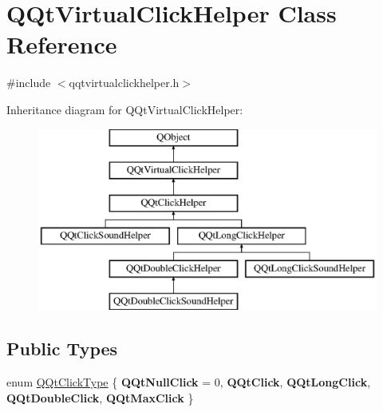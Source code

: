 \hypertarget{class_q_qt_virtual_click_helper}{}\section{Q\+Qt\+Virtual\+Click\+Helper Class Reference}
\label{class_q_qt_virtual_click_helper}


{\ttfamily \#include $<$qqtvirtualclickhelper.\+h$>$}

Inheritance diagram for Q\+Qt\+Virtual\+Click\+Helper\+:\begin{figure}[H]
\begin{center}
\leavevmode
\includegraphics[height=6.000000cm]{class_q_qt_virtual_click_helper}
\end{center}
\end{figure}
\subsection*{Public Types}
\begin{DoxyCompactItemize}
\item 
enum \mbox{\hyperlink{class_q_qt_virtual_click_helper_ace6c0c9b072e51f2cb3ff1316404b764}{Q\+Qt\+Click\+Type}} \{ \newline
{\bfseries Q\+Qt\+Null\+Click} = 0, 
{\bfseries Q\+Qt\+Click}, 
{\bfseries Q\+Qt\+Long\+Click}, 
{\bfseries Q\+Qt\+Double\+Click}, 
\newline
{\bfseries Q\+Qt\+Max\+Click}
 \}
\end{DoxyCompactItemize}
